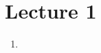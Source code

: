 \documentclass{article}
\author{DUE Jan. 22, 2014}
\begin{document}
\section{Lecture 1}
\begin{enumerate}
    \item 
\end{enumerate}
\end{document}
